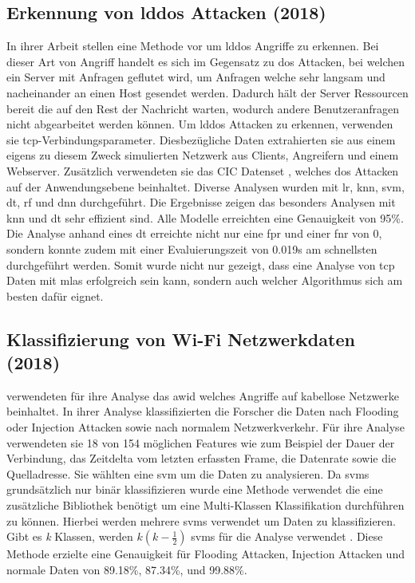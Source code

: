 \documentclass[
    12pt, %
    DIV10,
    ngerman, %
    a4paper, %
    oneside, %
    titlepage, %
    parskip=half, %
    headings=normal, %
    listof=totoc, %
    bibliography=totoc, %
    index=totoc, %
    captions=tableheading, %
    final %
]{scrreprt}
\begin{document}
\subsection{Erkennung von \acs{lddos} Attacken (2018)}\label{cic}
In ihrer Arbeit stellen \textcite{siracusano2018detection} eine Methode vor um \ac{lddos} Angriffe zu erkennen. Bei dieser Art von Angriff handelt es sich im Gegensatz zu \ac{dos} Attacken, bei welchen ein Server mit Anfragen geflutet wird, um Anfragen welche sehr langsam und nacheinander an einen Host gesendet werden. Dadurch hält der Server Ressourcen bereit die auf den Rest der Nachricht warten, wodurch andere Benutzeranfragen nicht abgearbeitet werden können. Um \ac{lddos} Attacken zu erkennen, verwenden sie \ac{tcp}-Verbindungsparameter. Diesbezügliche Daten extrahierten sie aus einem eigens zu diesem Zweck simulierten Netzwerk aus Clients, Angreifern und einem Webserver. Zusätzlich verwendeten sie das CIC Datenset \parencite{jazi2017detecting}, welches \ac{dos} Attacken auf der Anwendungsebene beinhaltet.
Diverse Analysen wurden mit \ac{lr}, \ac{knn}, \ac{svm}, \ac{dt}, \ac{rf} und \ac{dnn} durchgeführt. Die Ergebnisse zeigen das besonders Analysen mit \ac{knn} und \ac{dt} sehr effizient sind. Alle Modelle erreichten eine Genauigkeit von 95\%. Die Analyse anhand eines \acl{dt} erreichte nicht nur eine \ac{fpr} und einer \ac{fnr} von 0, sondern konnte zudem mit einer Evaluierungszeit von 0.019s am schnellsten durchgeführt werden. Somit wurde nicht nur gezeigt, dass eine Analyse von \ac{tcp} Daten mit \ac{mlas} erfolgreich sein kann, sondern auch welcher Algorithmus sich am besten dafür eignet.
%
\subsection{Klassifizierung von Wi-Fi Netzwerkdaten (2018)}
\textcite{Qin2018} verwendeten für ihre Analyse das \ac{awid} welches Angriffe auf kabellose Netzwerke beinhaltet. In ihrer Analyse klassifizierten die Forscher die Daten nach Flooding oder Injection Attacken sowie nach normalem Netzwerkverkehr. Für ihre Analyse verwendeten sie 18 von 154 möglichen Features wie zum Beispiel der Dauer der Verbindung, das Zeitdelta vom letzten erfassten Frame, die Datenrate sowie die Quelladresse. Sie wählten eine \ac{svm} um die Daten zu analysieren. Da \ac{svms} grundsätzlich nur binär klassifizieren wurde eine Methode verwendet die eine  zusätzliche Bibliothek benötigt um eine Multi-Klassen Klassifikation durchführen zu können. Hierbei werden mehrere \ac{svms} verwendet um Daten zu klassifizieren. Gibt es \emph{k} Klassen, werden \(k(k-\frac{1}{2})\) \ac{svms} für die Analyse verwendet \parencite{Qin2018}. Diese Methode erzielte eine Genauigkeit für Flooding Attacken, Injection Attacken und normale Daten von 89.18\%, 87.34\%, und
99.88\%.
%
%
\end{document}
